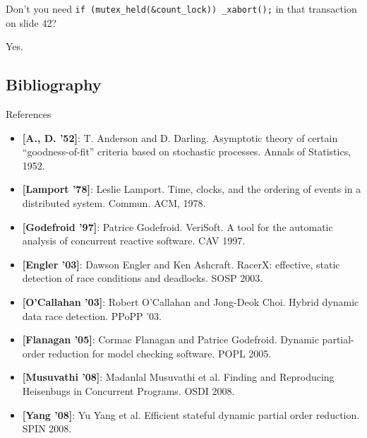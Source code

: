 \documentclass[xcolor=dvipsnames]{beamer}
\begin{document}
\begin{frame}{Don't you need \texttt{if (mutex\_held(\&count\_lock)) \_xabort();} in that transaction on slide 42?}
	\begin{center}
	Yes.
	\end{center}
\end{frame}

\subsection{Bibliography}

\begin{frame}{References}
	\footnotesize
	\begin{itemize}
		\item {\bf [A., D. '52]}: T. Anderson and D. Darling.
			Asymptotic theory of certain ``goodness-of-fit'' criteria based on stochastic processes.
			Annals of Statistics, 1952.
		\item {\bf [Lamport '78]}:
			Leslie Lamport. Time, clocks, and the ordering of events in a distributed system.
			Commun. ACM, 1978.
		\item {\bf [Godefroid '97]}: Patrice Godefroid.
			VeriSoft. A tool for the automatic analysis of concurrent reactive software. CAV 1997.
		\item {\bf [Engler '03]}: Dawson Engler and Ken Ashcraft.
			RacerX: effective, static detection of race conditions and deadlocks. SOSP 2003.
		\item {\bf [O'Callahan '03]}: Robert O'Callahan and Jong-Deok Choi.
			Hybrid dynamic data race detection. PPoPP '03.
		\item {\bf [Flanagan '05]}: Cormac Flanagan and Patrice Godefroid. Dynamic partial-order reduction for
			model checking software. POPL 2005.
		\item {\bf [Musuvathi '08]}: Madanlal Musuvathi et al. Finding and Reproducing Heisenbugs in Concurrent
			Programs. OSDI 2008.
		\item {\bf [Yang '08]}: Yu Yang et al. Efficient stateful dynamic partial order reduction. SPIN 2008.
	\end{itemize}
\end{frame}
\end{document}
